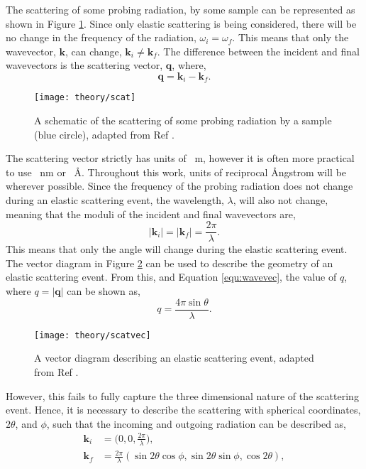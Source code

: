 The scattering of some probing radiation, by some sample can be represented as shown in Figure \ref{fig:scat}. Since only elastic scattering is being considered, there will be no change in the frequency of the radiation, $\omega_i = \omega_f$. This means that only the wavevector, $\mathbf{k}$, can change, $\mathbf{k}_i\neq \mathbf{k}_f$. The difference between the incident and final wavevectors is the scattering vector, $\mathbf{q}$, where,
%
\begin{equation}
	\mathbf{q} = \mathbf{k}_i - \mathbf{k}_f.
\end{equation}
%
%
\begin{figure}
	\centering
	\texttt{[image: theory/scat]}
	\caption{A schematic of the scattering of some probing radiation by a sample (blue circle), adapted from Ref \cite{Sivia2011}.}
	\label{fig:scat}
\end{figure}
%
The scattering vector strictly has units of \si{\per\meter}, however it is often more practical to use \si{\per\nano\meter} or \si{\per\angstrom}. Throughout this work, units of reciprocal \AA ngstrom will be wherever possible. Since the frequency of the probing radiation does not change during an elastic scattering event, the wavelength, $\lambda$, will also not change, meaning that the moduli of the incident and final wavevectors are,
%
\begin{equation}
	|\mathbf{k}_i| = |\mathbf{k}_f|=\frac{2\pi}{\lambda}.
	\label{equ:wavevec}
\end{equation}
%
This means that only the angle will change during the elastic scattering event. The vector diagram in Figure \ref{fig:scatvec} can be used to describe the geometry of an elastic scattering event. From this, and Equation \ref{equ:wavevec}, the value of $q$, where $q = |\mathbf{q}|$ can be shown as,
%
\begin{equation}
	q = \frac{4\pi\sin{\theta}}{\lambda}.
	\label{equ:theq}
\end{equation}
%
\begin{figure}
	\centering
	\texttt{[image: theory/scatvec]}
	\caption{A vector diagram describing an elastic scattering event, adapted from Ref \cite{Sivia2011}.}
	\label{fig:scatvec}
\end{figure}
%
However, this fails to fully capture the three dimensional nature of the scattering event. Hence, it is necessary to describe the scattering with spherical coordinates, $2\theta$, and $\phi$, such that the incoming and outgoing radiation can be described as,
%
\begin{equation}
	\begin{aligned}
		\mathbf{k}_i & = \bigg(0, 0, \frac{2\pi}{\lambda}\bigg), \\
		\mathbf{k}_f & = \frac{2\pi}{\lambda}(\sin{2\theta}\cos{\phi}, \sin{2\theta}\sin{\phi}, \cos{2\theta}),
	\end{aligned}
\end{equation}
